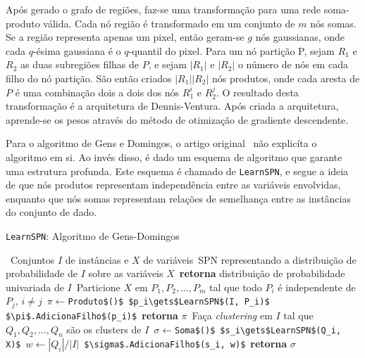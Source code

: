 \documentclass[12pt]{article}
\theoremstyle{plain}
\numberwithin{equation}{section}
\newcommand{\code}[1]{\lstinline[mathescape=true]{#1}}
\newcommand{\mcode}[1]{\lstinline[mathescape]!#1!}
\begin{document}
Após gerado o grafo de regiões, faz-se uma transformação para uma rede soma-produto válida. Cada
nó região é transformado em um conjunto de $m$ nós somas. Se a região representa apenas um pixel,
então geram-se $g$ nós gaussianas, onde cada $q$-ésima gaussiana é o $q$-quantil do pixel. Para um
nó partição P, sejam $R_1$ e $R_2$ as duas subregiões filhas de $P$, e sejam $|R_1|$ e $|R_2|$ o
número de nós em cada filho do nó partição. São então criados $|R_1| |R_2|$ nós produtos, onde cada
aresta de $P$ é uma combinação dois a dois dos nós $R_1^i$ e $R_2^j$. O resultado desta
transformação é a arquitetura de Dennis-Ventura. Após criada a arquitetura, aprende-se os pesos
através do método de otimização de gradiente descendente.

Para o algoritmo de Gens e Domingos, o artigo original~\cite{gens-domingos} não explicíta o
algoritmo em si. Ao invés disso, é dado um esquema de algoritmo que garante uma estrutura profunda.
Este esquema é chamado de \code{LearnSPN}, e segue a ideia de que nós produtos representam
independência entre as variáveis envolvidas, enquanto que nós somas representam relações de
semelhança entre as instâncias do
conjunto de dado.

\begin{algorithm}[H]
  \caption*{\code{LearnSPN}: Algoritmo de Gens-Domingos}
  \begin{algorithmic}[1]
    \Require\, Conjuntos $I$ de instâncias e $X$ de variáveis
    \Ensure\,SPN representando a distribuição de probabilidade de $I$ sobre as variáveis $X$
      \State\,\textbf{retorna} distribuição de probabilidade univariada de $I$
    \Else%
      \State\,Particione $X$ em $P_1,P_2,\ldots,P_m$ tal que todo $P_i$ é independente de $P_j$,
      $i\neq j$
        \State\,$\pi\gets$\mcode{Produto$()$}
          \State\,\mcode{$p_i\gets$LearnSPN$(I, P_i)$}
          \State\,\mcode{$\pi$.AdicionaFilho$(p_i)$}
        \EndFor%
        \State\,\textbf{retorna} $\pi$
      \Else%
        \State\,Faça \textit{clustering} em $I$ tal que $Q_1,Q_2,\ldots,Q_n$ são os clusters de $I$
        \State\,$\sigma\gets$\mcode{Soma$()$}
          \State\,\mcode{$s_i\gets$LearnSPN$(Q_i, X)$}
          \State\,$w\gets |Q_i|/|I|$
          \State\,\mcode{$\sigma$.AdicionaFilho$(s_i, w)$} 
        \EndFor%
        \State\,\textbf{retorna} $\sigma$
      \EndIf%
    \EndIf%
  \end{algorithmic}
\end{algorithm}
\end{document}
